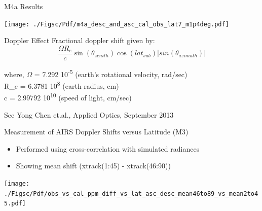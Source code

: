 \documentclass[10pt,t]{beamer}
\begin{document}
\begin{frame}[label={sec:orgbad9e2c}]{M4a Results}
\begin{center}
\texttt{[image: ./Figsc/Pdf/m4a\_desc\_and\_asc\_cal\_obs\_lat7\_m1p4deg.pdf]}
\end{center}
\end{frame}

\begin{frame}[label={sec:org9fed8c6},shrink=0]{Doppler Effect}
Fractional doppler shift given by:\\

\begin{displaymath}
\frac{\Omega R_e}{c} \sin(\theta_{zenith}) \cos(lat_{sub}) |sin(\theta_{azimuth})|
\end{displaymath}

\small where, \(\Omega\) = 7.292 \texttimes{} 10\textsuperscript{-5} (earth's rotational velocity, rad/sec) \\
R\_e = 6.3781 \texttimes{} 10\textsuperscript{8} (earth radius, cm) \\
c = 2.99792 \texttimes{} 10\textsuperscript{10}  (speed of light, cm/sec)\\

\vspace{0.2in}

\small See Yong Chen et.al.,  Applied Optics, September 2013
\end{frame}

\begin{frame}[label={sec:orgdcf87d6}]{Measurement of AIRS Doppler Shifts versus Latitude (M3)}
\begin{itemize}
\item Performed using cross-correlation with simulated radiances
\item Showing mean shift (xtrack(1:45) - xtrack(46:90))
\end{itemize}

\begin{center}
\texttt{[image: ./Figsc/Pdf/obs\_vs\_cal\_ppm\_diff\_vs\_lat\_asc\_desc\_mean46to89\_vs\_mean2to45.pdf]}
\end{center}
\end{frame}
\end{document}

